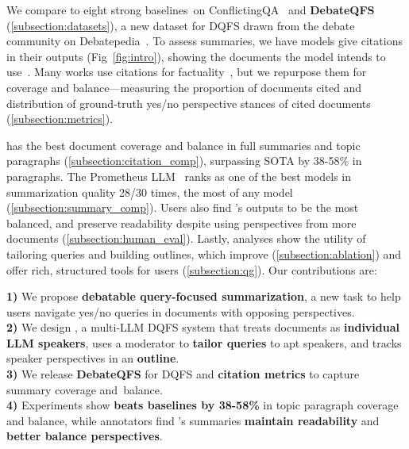 We compare \model to eight strong baselines~on ConflictingQA~\cite{wan2024evidence} and \textbf{DebateQFS} (\cref{subsection:datasets}), a new dataset for DQFS drawn from the debate community on Debatepedia~\cite{gottopati2013learning}.
To assess summaries, we have models give citations in their outputs (Fig~\ref{fig:intro}), showing the documents the model intends to use~\cite{huang-chang-2024-citation}.
Many works use citations for factuality~\cite{li2024citation}, but
we repurpose them for coverage and balance---measuring the proportion of documents cited and distribution of ground-truth yes/no perspective stances of cited documents (\cref{subsection:metrics}).


\model has the best document coverage and balance in full summaries and topic paragraphs (\cref{subsection:citation_comp}), surpassing SOTA by 38-58\% in paragraphs.
The Prometheus LLM~\cite{kim2024prometheus} ranks \model as one of the best models in summarization quality 28/30 times, the most of any model (\cref{subsection:summary_comp}).
Users also find \model's outputs to be the most balanced, and preserve readability despite using perspectives from more documents (\cref{subsection:human_eval}).
Lastly, analyses show the utility of tailoring queries and building outlines, which improve \model (\cref{subsection:ablation}) and offer rich, structured tools for users (\cref{subsection:qg}). Our contributions are:

\noindent \textbf{1)} We propose \textbf{debatable query-focused summarization}, a new task to help users navigate yes/no queries in documents with opposing perspectives. \\
\noindent \textbf{2)} We design \model, a multi-LLM DQFS system that treats documents as \textbf{individual} \textbf{LLM speakers}, uses a moderator to \textbf{tailor queries} to apt speakers, and tracks speaker perspectives in an \textbf{outline}. \\
\noindent \textbf{3)} We release \textbf{DebateQFS} for DQFS and \textbf{citation metrics} to capture summary coverage and~balance. \\
\noindent \textbf{4)} Experiments show \model \textbf{beats baselines by 38-58\%} in topic paragraph coverage and balance, while annotators find \model's summaries \textbf{maintain readability} and \textbf{better balance perspectives}.